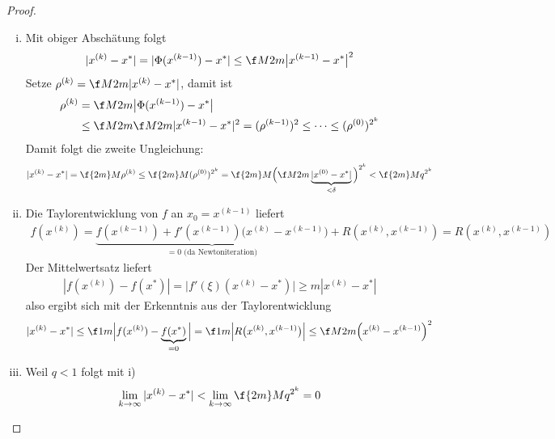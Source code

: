 \documentclass[11pt]{scrbook}
\begin{document}
\begin{st}
\begin{note}
\begin{proof}
			\begin{enumerate}[i)]
				\item
					Mit obiger Abschätung folgt
					\begin{align*}
						|x^{(k)}-x^*| = |\Phi(x^{(k-1)}) - x^*| \le \f M{2m} \big|x^{(k-1)} - x^*\big|^2
					\end{align*}
					Setze $\rho^{(k)} = \f M{2m}|x^{(k)}-x^*|$, damit ist
					\begin{align*}
						\rho^{(k)} 
						&= \f M{2m} \big| \Phi(x^{(k-1)}) - x^*\big| \\
						&\le \f M{2m} \f M{2m} |x^{(k-1)} - x^*|^2 
						= (\rho^{(k-1)})^2 
						\le \dotsb \le
						(\rho^{(0)})^{2^k}
					\end{align*}
					Damit folgt die zweite Ungleichung:
					\begin{align*}
						|x^{(k)} - x^*|
						= \f {2m}M \rho^{(k)}
						\le \f {2m}M (\rho^{(0)})^{2^k}
						= \f {2m}M \Big( \f M{2m} \underbrace{|x^{(0)}-x^*|}_{< \delta} \Big)^{2^k}
						< \f {2m}M q^{2^k}
					\end{align*}
				\item
					Die Taylorentwicklung von $f$ an $x_0 = x^{(k-1)}$ liefert
					\begin{align*}
						f(x^{(k)}) = \underbrace{f(x^{(k-1)}) + f'(x^{(k-1)})\big(x^{(k)}-x^{(k-1)}\big)}_{=0 \text{ (da Newtoniteration)}} + R(x^{(k)},x^{(k-1)}) = R(x^{(k)},x^{(k-1)})
					\end{align*}
					Der Mittelwertsatz liefert
					\begin{align*}
						|f(x^{(k)}) -f(x^*)| = \big|f'(\xi)(x^{(k)}-x^*)\big| \ge m|x^{(k)} -x^*|
					\end{align*}
					also ergibt sich mit der Erkenntnis aus der Taylorentwicklung
					\begin{align*}
						|x^{(k)} -x^*|
						\le \f 1m \Big|f(x^{(k)}) - \underbrace{f(x^*)}_{=0}\Big|
						= \f 1m \Big|R\big(x^{(k)}, x^{(k-1)}\big) \Big|
						\le \f M{2m} \Big(x^{(k)} -x^{(k-1)}\Big)^2
					\end{align*}
				\item
					Weil $q<1$ folgt mit i)
					\begin{align*}
						\lim_{k\to \infty} |x^{(k)} -x^*| < \lim_{k\to \infty} \f {2m}M q^{2^k} = 0
					\end{align*}
			\end{enumerate}
		\end{proof}
	\end{note}
\end{st}
\end{document}

